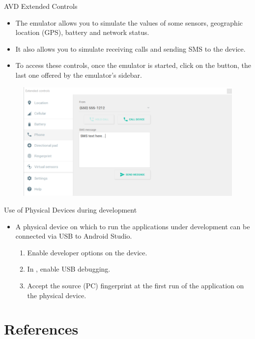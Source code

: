 \documentclass{beamer}
\begin{document}
  \begin{frame}[allowframebreaks]{AVD Extended Controls}
    \begin{itemize}
      \item The emulator allows you to simulate the values of some sensors,
      geographic location (GPS), battery and network status.
      \item It also allows you to simulate receiving calls and sending SMS to
      the device.
      \item To access these controls, once the emulator is started, click on the
       button, the last one offered by the emulator's sidebar. 
    \end{itemize}
    \begin{figure}
      \includegraphics[width=1\linewidth]{figures/avd-8.png}
    \end{figure}
  \end{frame}

  \begin{frame}{Use of Physical Devices during development}
    \begin{itemize}\itemsep10pt
      \item A physical device on which to run the applications under development
      can be connected via USB to Android Studio. 
      \begin{enumerate}
        \item Enable developer options on the device. 
        \item In , enable USB debugging.
        \item Accept the source (PC) fingerprint at the first run of the
        application on the physical device.  
      \end{enumerate}
    \end{itemize}
  \end{frame}

\section*{References}

\end{document}
